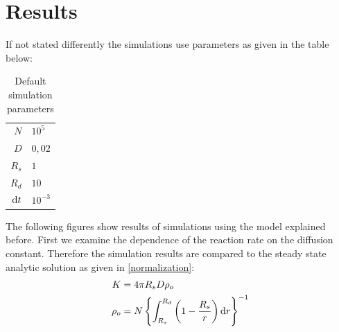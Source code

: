 \section{Results}
If not stated differently the simulations use parameters as given in the table below:
\begin{table}[H]
    \centering
    \begin{tabular}{r|l}
        $N$ & $10^{5}$\\
        $D$ & $0,02$\\
        $R_s$ & $1$ \\
        $R_d$ & $10$ \\
        ${\rm d}t$ & $10^{-3}$
    \end{tabular}
    \caption{Default simulation parameters}
    \label{tab:Parameters}
\end{table}
The following figures show results of simulations using the model explained before. First we examine the dependence of the reaction rate on the diffusion constant. Therefore the simulation results are compared to the steady state analytic solution as given in \eqref{normalization}:
\begin{align}
    K &= 4 \pi R_s D \rho_o \\
    \rho_o &= N \left\{ \int_{R_s}^{R_d} \left( 1 - \frac{R_s}{r} \right) {\rm d} r \right\}^{-1}
    \label{Steady_state_rate}
\end{align}
